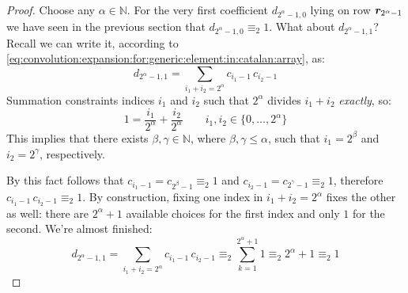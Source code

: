 \begin{proof}
    Choose any $\alpha\in\mathbb{N}$. For the very first coefficient $d_{2^{\alpha}-1,0}$ 
    lying on row $\boldsymbol{r}_{2^{\alpha}-1}$ we have seen in the
    previous section that $d_{2^{\alpha}-1,0}\equiv_{2}1$. What about $d_{2^{\alpha}-1,1}$?
    Recall we can write it, according to 
    \autoref{eq:convolution:expansion:for:generic:element:in:catalan:array}, as:
    \begin{displaymath}
        d_{2^{\alpha}-1,1} = \sum_{i_{1}+ i_{2}=2^{\alpha}}{ c_{i_{1}-1}\,c_{i_{2}-1} }
    \end{displaymath}
    Summation constraints indices $i_{1}$ and $i_{2}$ such that 
    $2^{\alpha}$ divides $i_{1}+i_{2}$ \emph{exactly}, so:
    \begin{displaymath}
        1 = \frac{i_{1}}{2^{\alpha}}+\frac{i_{2}}{2^{\alpha}} \qquad 
            i_{1},i_{2}\in\lbrace 0,\ldots,2^{\alpha}\rbrace
    \end{displaymath}
    This implies that there exists $\beta,\gamma\in\mathbb{N}$, where $\beta,\gamma\leq\alpha$,
    such that $i_{1}=2^{\beta}$ and $i_{2}=2^{\gamma}$, respectively.

    By this fact follows that $c_{i_{1}-1}=c_{2^{\beta}-1}\equiv_{2}1$ and 
    $c_{i_{2}-1}=c_{2^{\gamma}-1}\equiv_{2}1$, therefore $c_{i_{1}-1}\,c_{i_{2}-1}\equiv_{2}1$.
    By construction, fixing one index in  
    $i_{1}+ i_{2}=2^{\alpha}$ fixes the other as well: there are $2^{\alpha}+1$ available choices
    for the first index and only $1$ for the second.
    We're almost finished:
    \begin{displaymath}
        d_{2^{\alpha}-1,1} = \sum_{i_{1}+ i_{2}=2^{\alpha}}{ c_{i_{1}-1}\,c_{i_{2}-1} }
            \equiv_{2} \sum_{k=1}^{2^{\alpha}+1}{1}\equiv_{2} 2^{\alpha}+1\equiv_{2} 1
    \end{displaymath}


\end{proof}
